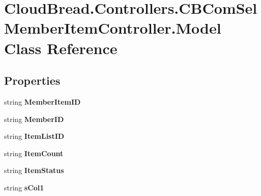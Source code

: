 \hypertarget{a00159}{}\section{Cloud\+Bread.\+Controllers.\+C\+B\+Com\+Sel\+Member\+Item\+Controller.\+Model Class Reference}
\label{a00159}
\subsection*{Properties}
\begin{DoxyCompactItemize}
\item 
string {\bfseries Member\+Item\+ID}\hypertarget{a00159_a015ecaa641ca7c26e3cf366efa8d6940}{}\label{a00159_a015ecaa641ca7c26e3cf366efa8d6940}

\item 
string {\bfseries Member\+ID}\hypertarget{a00159_a77175886d64c1b0ea1245957dbf435f2}{}\label{a00159_a77175886d64c1b0ea1245957dbf435f2}

\item 
string {\bfseries Item\+List\+ID}\hypertarget{a00159_ab4a8af0e951d0ee26d5dbc98aac94f31}{}\label{a00159_ab4a8af0e951d0ee26d5dbc98aac94f31}

\item 
string {\bfseries Item\+Count}\hypertarget{a00159_a660411a10024b82697be0ea8b081e237}{}\label{a00159_a660411a10024b82697be0ea8b081e237}

\item 
string {\bfseries Item\+Status}\hypertarget{a00159_a1f641b1c6ca4d1bedf0e96674b647c07}{}\label{a00159_a1f641b1c6ca4d1bedf0e96674b647c07}

\item 
string {\bfseries s\+Col1}\hypertarget{a00159_a4bc700fdc72bacd71212336e6c893939}{}\label{a00159_a4bc700fdc72bacd71212336e6c893939}


\end{DoxyCompactItemize}
